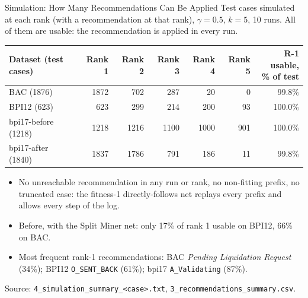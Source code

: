 \documentclass[aspectratio=169]{beamer} %
\begin{document}
\begin{frame}{Simulation: How Many Recommendations Can Be Applied}
  \footnotesize
  Test cases \alert{simulated} at each rank (with a recommendation at that rank), $\gamma = 0.5$, $k = 5$,
  10 runs. All of them are \alert{usable}: the recommendation is applied in every run.
  \begin{center}\setlength{\tabcolsep}{5pt}
  \begin{tabular}{lrrrrrr}
    \toprule
    Dataset (test cases) & Rank 1 & Rank 2 & Rank 3 & Rank 4 & Rank 5 & \shortstack{R-1 usable,\\ \% of test} \\
    \midrule
    BAC (1876)          & 1872 &  702 &  287 &   20 &   0 &  99.8\% \\
    BPI12 (623)         &  623 &  299 &  214 &  200 &  93 & 100.0\% \\
    bpi17-before (1218) & 1218 & 1216 & 1100 & 1000 & 901 & 100.0\% \\
    bpi17-after (1840)  & 1837 & 1786 &  791 &  186 &  11 &  99.8\% \\
    \bottomrule
  \end{tabular}
  \end{center}
  \begin{itemize}
    \item \alert{No unreachable recommendation} in any run or rank, no non-fitting prefix, no truncated case:
      the fitness-1 directly-follows net replays every prefix and allows every step of the log.
    \item Before, with the Split Miner net: only 17\% of rank 1 usable on BPI12, 66\% on BAC.
    \item Most frequent rank-1 recommendations: BAC \emph{Pending Liquidation Request} (34\%); BPI12
      \texttt{O\_SENT\_BACK} (61\%); bpi17 \texttt{A\_Validating} (87\%).
  \end{itemize}
  {\scriptsize Source: \texttt{4\_simulation\_summary\_<case>.txt}, \texttt{3\_recommendations\_summary.csv}.}
\end{frame}
\end{document}
